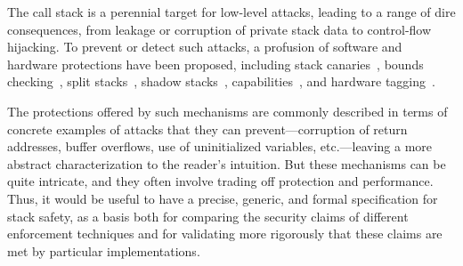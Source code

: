 \documentclass[acmsmall,review,anonymous]{acmart}\settopmatter{printfolios=true,printccs=false,printacmref=false}
\begin{document}

The call stack is a perennial target for low-level attacks, leading to a
range of dire consequences, from leakage or corruption of private stack data
to control-flow hijacking. To prevent or detect such attacks, a profusion of
software and hardware protections have been proposed,
%
including stack canaries~\citep{Cowan+98},
bounds checking~\citep{NagarakatteZMZ09,NagarakatteZMZ10,DeviettiBMZ08},
split stacks~\citep{Kuznetsov+14},
shadow stacks~\citep{Dang+15,Shanbhogue+19},
capabilities~\citep{Woodruff+14,Chisnall+15,SkorstengaardLocal,SkorstengaardSTKJFP,Georges+21},
and hardware tagging~\citep{DBLP:conf/sp/RoesslerD18}. \ifaftersubmission{}
\fi

The protections offered by such mechanisms are commonly described in terms
of concrete examples of attacks that they can prevent---corruption
of return addresses, buffer overflows, use of uninitialized variables,
etc.---leaving a more abstract characterization to the reader's intuition.
But these mechanisms can be quite intricate,
and they often involve trading off protection and performance.
Thus, it would be useful to have a precise, generic, and formal
specification for stack
safety, as a basis both for comparing the security claims of different
enforcement techniques and for validating more rigorously that these claims
are met by particular implementations.
\end{document}
